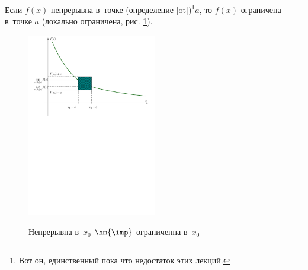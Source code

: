 
Если $f(x)$ непрерывна в~точке (определение \ref{ot})\footnote{Вот он, единственный пока что недостаток этих лекций.}$a$, то $f(x)$ ограничена в~точке $a$ (локально ограничена, рис. \ref{pogr}).

\begin{figure}[htbp]\centering
    \includegraphics[height=8cm]{img/final/galat/ogr.pdf}\\ \caption{Непрерывна в~$x_0$ $\hm{\imp}$ ограниченна в~$x_0$}\label{pogr}
\end{figure}
